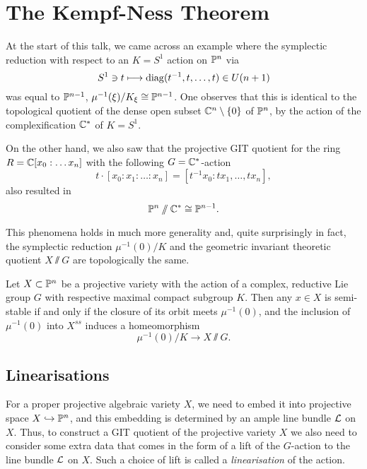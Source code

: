 \section{The Kempf-Ness Theorem}

At the start of this talk, we came across an example where the symplectic reduction with respect to an $K = S^{1}$ action on $\mathbb{P}^{n}$ via
$$
	S^{1} \ni t \longmapsto \operatorname{diag}(t^{-1}, t,\ldots, t) \in U(n+1)
$$
was equal to $\mathbb{P}^{n-1}$, \ie $\mu^{-1}(\xi)/K_{\xi} \cong \mathbb{P}^{n-1}$. One observes that this is identical to the topological quotient of the dense open subset $\mathbb{C}^{n}\setminus \{0\}$ of $\mathbb{P}^{n}$, by the action of the complexification $\mathbb{C}^{\ast}$ of $K = S^{1}$.

On the other hand, we also saw that the projective GIT quotient for the ring $R = \mathbb{C}[x_{0}: \ldots x_{n}]$ with the following $G = \mathbb{C}^{\ast}$-action
$$
	t\cdot [x_{0}: x_{1}: \ldots : x_{n}] = [t^{-1}x_{0}: tx_{1},\ldots, tx_{n}],
$$
also resulted in
$$
	\mathbb{P}^{n} \sslash \mathbb{C}^{\ast} \cong \mathbb{P}^{n-1}.
$$

This phenomena holds in much more generality and, quite surprisingly in fact, the symplectic reduction $\mu^{-1}(0)/K$ and the geometric invariant theoretic quotient $X \sslash G$ are topologically the same.

\begin{thm}
	Let $X \subset \mathbb{P}^{n}$ be a projective variety with the action of a complex, reductive Lie group $G$ with respective maximal compact subgroup $K$. Then any $x \in X$ is semi-stable if and only if the closure of its orbit meets $\mu^{-1}(0)$, and the inclusion of $\mu^{-1}(0)$ into $X^{ss}$ induces a homeomorphism
	$$
		\mu^{-1}(0)/K \longrightarrow X \sslash G.
	$$
\end{thm}

\subsection{Linearisations}

For a proper projective algebraic variety $X$, we need to embed it into projective space $X \hookrightarrow \mathbb{P}^{n}$, and this embedding is determined by an ample line bundle $\mathcal{L}$ on $X$. Thus, to construct a GIT quotient of the projective variety $X$ we also need to consider some extra data that comes in the form of a lift of the $G$-action to the line bundle $\mathcal{L}$ on $X$. Such a choice of lift is called a \emph{linearisation} of the action.

